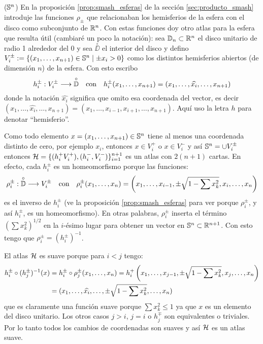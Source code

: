 \documentclass[../../topologia_algebraica]{subfiles}
\begin{document}
\begin{ejemplo}\label{ejemplo:cartas_hemisferios}($\mathbb{S}^n$)
  En la proposici\'on \ref{prop:smash_esferas} de la secci\'on \ref{sec:producto_smash} introduje
  las funciones $\rho_{\pm}$ que relacionaban los hemisferios
  de la esfera con el disco como subconjunto de $\mathbb{R}^n$. Con estas funciones doy otro atlas para la
  esfera que resulta \'util (cambiar\'e un poco la notaci\'on): sea $\mathbb{D}_n\subset\mathbb{R}^n$ el disco
  unitario de radio 1 alrededor del 0 y sea $\overset{\circ}{\DD}$ el interior del disco y defino
  $V_i^{\pm}:=\{(x_1,\ldots,x_{n+1})\in\mathbb{S}^n\mid \pm x_i>0\}$ como los distintos hemisferios abiertos
  (de dimensi\'on $n$) de la esfera. Con esto escribo
  \[
    h_i^{\pm}:V_i^{\pm}\longrightarrow \overset{\circ}{\mathbb{D}}  \quad\text{con}\quad
    h_i^{\pm}(x_1,\ldots,x_{n+1})=(x_1,\ldots,\widehat{x_i},\ldots,x_{n+1})
  \]
  donde la notaci\'on $\widehat{x_i}$ significa que omito esa coordenada del vector, es decir
  $(x_1,\ldots,\widehat{x_i},\ldots,x_{n+1})=(x_1,\ldots,x_{i-1},x_{i+1},\ldots,x_{n+1})$. Aqu\'i
  uso la letra $h$ para denotar ``hemisferio''.

  Como todo elemento $x=(x_1,\ldots,x_{n+1})\in\mathbb{S}^n$ tiene al menos una coordenada distinto de cero,
  por ejemplo $x_i$, entonces $x\in V_i^+$ o $x\in V_i^-$ y as\'i $\mathbb{S}^n=\cup V_i^{\pm}$ entonces
  $\mathcal{H}=\{(h_i^+V_i^+),(h_i^-,V_i^-)\}_{i=1}^{n+1}$ es un atlas con $2(n+1)$ cartas. En efecto, cada
  $h_i^{\pm}$ es un homeomorfismo porque las funciones:
  \[
    \rho_i^{\pm}:\overset{\circ}{\mathbb{D}} \longrightarrow V_i^{\pm} \quad\text{con}\quad
    \rho_i^{\pm}(x_1,\ldots,x_n)=\left( x_1,\ldots,x_{i-1},\pm\sqrt{1-\sum x_k^2},x_{i},\ldots,x_n \right)
  \]
  es el inverso de $h_i^{\pm}$ (ve la proposici\'on \ref{prop:smash_esferas} para ver porque
  $\rho_i^{\pm}$, y as\'i $h_i^{\pm}$, es un homeomorfismo). En otras palabras, $\rho_i^{\pm}$ inserta
  el t\'ermino $(\sum x_k^2)^{1/2}$ en la $i$-\'esimo lugar para obtener un vector en
  $\mathbb{S}^n\subset\mathbb{R}^{n+1}$. Con esto tengo que $\rho_i^{\pm}=(h_i^{\pm})^{-1}$.

  El atlas $\mathcal{H}$ es suave porque para $i< j$ tengo:
  \begin{align*}
    h_i^{\pm}\circ (h_j^{\pm})^{-1}(x)& =
    h_i^{\pm}\circ \rho_j^{\pm}(x_1,\ldots,x_n)=
    h_i^+\left( x_1,\ldots,x_{j-1},\pm\sqrt{1-\sum x_k^2},x_j,\ldots,x_n \right) \\ & =
    (x_1,\ldots,\widehat{x_i},\ldots,\pm\sqrt{1-\sum x_k^2},\ldots,x_n)
  \end{align*}
  que es claramente una funci\'on suave porque $\sum x_k^2\leq 1$ ya que $x$ es un elemento del disco
  unitario. Los otros casos $j>i$, $j=i$ o $h_j^{\mp}$ son equivalentes o triviales. Por lo tanto
  todos los cambios de coordenadas son suaves y as\'i $\mathcal{H}$ es un atlas suave.
\end{ejemplo}
\end{document}
